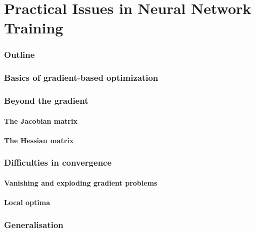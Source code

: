\renewcommand{\thispart}{5 }
\renewcommand{\thispartname}{Practical Issues in Neural Network Training}

\part{\thispartname}

\section{Outline}




\section{Basics of gradient-based optimization}

\section{Beyond the gradient}
\subsection{The Jacobian matrix}

\subsection{The Hessian matrix}


\section{Difficulties in convergence}

\subsection{Vanishing and exploding gradient problems}

\subsection{Local optima}

\section{Generalisation}


